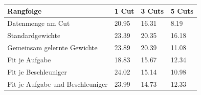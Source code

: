 \begin{tabular}{@{}llll@{}}
\toprule
Rangfolge & 1 Cut & 3 Cuts & 5 Cuts \\
\midrule
Datenmenge am Cut & 20.95 & 16.31 & 8.19 \\
Standardgewichte & 23.39 & 20.35 & 16.18 \\
Gemeinsam gelernte Gewichte & 23.89 & 20.39 & 11.08 \\
Fit je Aufgabe & 18.83 & 15.67 & 12.34 \\
Fit je Beschleuniger & 24.02 & 15.14 & 10.98 \\
Fit je Aufgabe und Beschleuniger & 23.99 & 14.73 & 12.33 \\
\bottomrule
\end{tabular}

